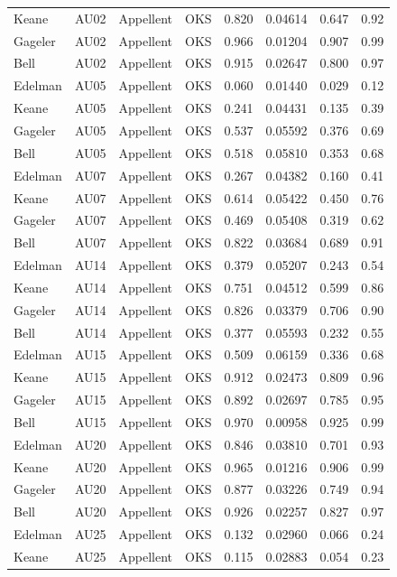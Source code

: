 \documentclass{monashthesis}
\begin{document}
\begin{center}
\begin{longtable}{llllllll}
Keane & AU02 & Appellent & OKS & 0.820 & 0.04614 & 0.647 & 0.92 \\
Gageler & AU02 & Appellent & OKS & 0.966 & 0.01204 & 0.907 & 0.99 \\
Bell & AU02 & Appellent & OKS & 0.915 & 0.02647 & 0.800 & 0.97 \\
Edelman & AU05 & Appellent & OKS & 0.060 & 0.01440 & 0.029 & 0.12 \\
Keane & AU05 & Appellent & OKS & 0.241 & 0.04431 & 0.135 & 0.39 \\
Gageler & AU05 & Appellent & OKS & 0.537 & 0.05592 & 0.376 & 0.69 \\
Bell & AU05 & Appellent & OKS & 0.518 & 0.05810 & 0.353 & 0.68 \\
Edelman & AU07 & Appellent & OKS & 0.267 & 0.04382 & 0.160 & 0.41 \\
Keane & AU07 & Appellent & OKS & 0.614 & 0.05422 & 0.450 & 0.76 \\
Gageler & AU07 & Appellent & OKS & 0.469 & 0.05408 & 0.319 & 0.62 \\
Bell & AU07 & Appellent & OKS & 0.822 & 0.03684 & 0.689 & 0.91 \\
Edelman & AU14 & Appellent & OKS & 0.379 & 0.05207 & 0.243 & 0.54 \\
Keane & AU14 & Appellent & OKS & 0.751 & 0.04512 & 0.599 & 0.86 \\
Gageler & AU14 & Appellent & OKS & 0.826 & 0.03379 & 0.706 & 0.90 \\
Bell & AU14 & Appellent & OKS & 0.377 & 0.05593 & 0.232 & 0.55 \\
Edelman & AU15 & Appellent & OKS & 0.509 & 0.06159 & 0.336 & 0.68 \\
Keane & AU15 & Appellent & OKS & 0.912 & 0.02473 & 0.809 & 0.96 \\
Gageler & AU15 & Appellent & OKS & 0.892 & 0.02697 & 0.785 & 0.95 \\
Bell & AU15 & Appellent & OKS & 0.970 & 0.00958 & 0.925 & 0.99 \\
Edelman & AU20 & Appellent & OKS & 0.846 & 0.03810 & 0.701 & 0.93 \\
Keane & AU20 & Appellent & OKS & 0.965 & 0.01216 & 0.906 & 0.99 \\
Gageler & AU20 & Appellent & OKS & 0.877 & 0.03226 & 0.749 & 0.94 \\
Bell & AU20 & Appellent & OKS & 0.926 & 0.02257 & 0.827 & 0.97 \\
Edelman & AU25 & Appellent & OKS & 0.132 & 0.02960 & 0.066 & 0.24 \\
Keane & AU25 & Appellent & OKS & 0.115 & 0.02883 & 0.054 & 0.23 \\

\end{longtable}
\end{center}
\end{document}
